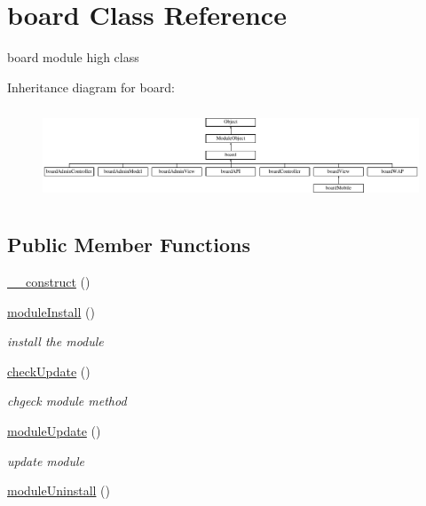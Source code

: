 \hypertarget{classboard}{\section{board Class Reference}
\label{classboard}
}


board module high class  


Inheritance diagram for board\-:\begin{figure}[H]
\begin{center}
\leavevmode
\includegraphics[height=2.777778cm]{classboard}
\end{center}
\end{figure}
\subsection*{Public Member Functions}
\begin{DoxyCompactItemize}
\item 
\hyperlink{classboard_a7ef7c9111091a0b52b108443c50112ec}{\-\_\-\-\_\-construct} ()
\item 
\hyperlink{classboard_abcf015f709c0c2809dba55f74f059ebc}{module\-Install} ()
\begin{DoxyCompactList}\small\item\em install the module \end{DoxyCompactList}\item 
\hyperlink{classboard_a64506bb5293024e146d0ff7deeb27684}{check\-Update} ()
\begin{DoxyCompactList}\small\item\em chgeck module method \end{DoxyCompactList}\item 
\hyperlink{classboard_ab6b25ead0f4ec6d25f60338c7cdd33b5}{module\-Update} ()
\begin{DoxyCompactList}\small\item\em update module \end{DoxyCompactList}\item 
\hyperlink{classboard_a1e6008fcf4e2a540370e242246b8e721}{module\-Uninstall} ()
\end{DoxyCompactItemize}
